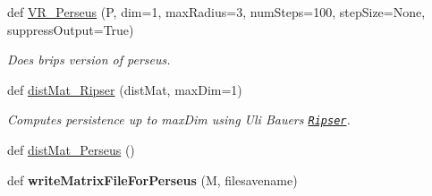 \begin{DoxyCompactItemize}
\item 
def \hyperlink{namespaceteaspoon_1_1_t_d_a_1_1_persistence_ae3954f45636c5f88b8e7cb7b422eea3d}{V\+R\+\_\+\+Perseus} (P, dim=1, max\+Radius=3, num\+Steps=100, step\+Size=None, suppress\+Output=True)
\begin{DoxyCompactList}\small\item\em Does brips version of perseus. \end{DoxyCompactList}\item 
def \hyperlink{namespaceteaspoon_1_1_t_d_a_1_1_persistence_a5d253547a9b956b8d5169808f31b42d2}{dist\+Mat\+\_\+\+Ripser} (dist\+Mat, max\+Dim=1)
\begin{DoxyCompactList}\small\item\em Computes persistence up to max\+Dim using Uli Bauer\textquotesingle{}s \href{https://github.com/Ripser/ripser}{\tt Ripser}. \end{DoxyCompactList}\item 
def \hyperlink{namespaceteaspoon_1_1_t_d_a_1_1_persistence_a0660fcd00ca57001f21bfaaefb1da9c3}{dist\+Mat\+\_\+\+Perseus} ()
\item 
def {\bfseries write\+Matrix\+File\+For\+Perseus} (M, filesavename)\hypertarget{namespaceteaspoon_1_1_t_d_a_1_1_persistence_a7ee47776929d1ade75b059415918a328}{}\label{namespaceteaspoon_1_1_t_d_a_1_1_persistence_a7ee47776929d1ade75b059415918a328}


\end{DoxyCompactItemize}
